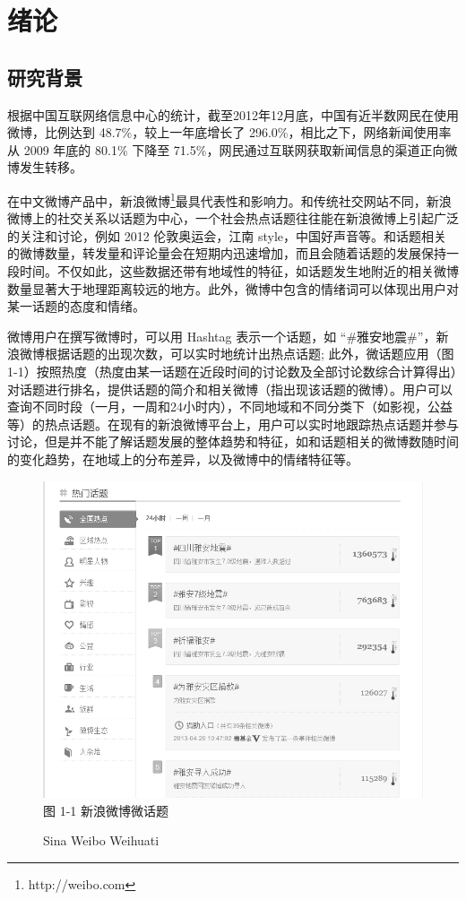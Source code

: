\chapter{绪论}
\thispagestyle{fancy}
\section{研究背景}
根据中国互联网络信息中心的统计\cite{CN12}，截至2012年12月底，中国有近半数网民在使用微博，比例达到 48.7\%，较上一年底增长了 296.0\%，相比之下，网络新闻使用率从 2009 年底的 80.1\% 下降至 71.5\%，网民通过互联网获取新闻信息的渠道正向微博发生转移。
   
在中文微博产品中，新浪微博\footnote{http://weibo.com}最具代表性和影响力。和传统社交网站不同，新浪微博上的社交关系以话题为中心，一个社会热点话题往往能在新浪微博上引起广泛的关注和讨论，例如 2012 伦敦奥运会，江南 style，中国好声音等。和话题相关的微博数量，转发量和评论量会在短期内迅速增加，而且会随着话题的发展保持一段时间。不仅如此，这些数据还带有地域性的特征，如话题发生地附近的相关微博数量显著大于地理距离较远的地方。此外，微博中包含的情绪词可以体现出用户对某一话题的态度和情绪。

微博用户在撰写微博时，可以用 Hashtag \cite{hashtag} 表示一个话题，如 “\#雅安地震\#”，新浪微博根据话题的出现次数，可以实时地统计出热点话题; 此外，微话题应用（图 1-1）按照热度（热度由某一话题在近段时间的讨论数及全部讨论数综合计算得出）对话题进行排名，提供话题的简介和相关微博（指出现该话题的微博）。用户可以查询不同时段（一月，一周和24小时内），不同地域和不同分类下（如影视，公益等）的热点话题。在现有的新浪微博平台上，用户可以实时地跟踪热点话题并参与讨论，但是并不能了解话题发展的整体趋势和特征，如和话题相关的微博数随时间的变化趋势，在地域上的分布差异，以及微博中的情绪特征等。

\begin{figure}[t]
\centering
\includegraphics[width=\textwidth, height=0.35\textheight]{weihuati}
图 1-1 新浪微博微话题 
\caption{Sina Weibo Weihuati}
\end{figure}

